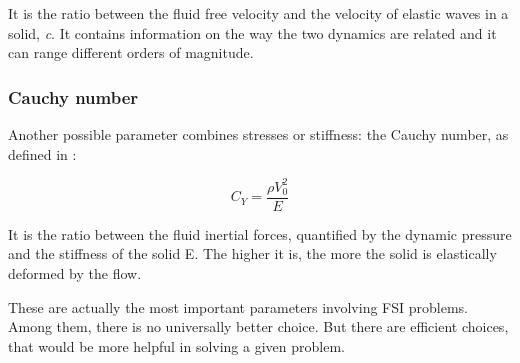 It is the ratio between the fluid free velocity and the velocity of elastic waves in a solid, \textit{c}. It contains information on the way the two dynamics are related and it can range different orders of magnitude.

\subsubsection{Cauchy number}

Another possible parameter combines stresses or stiffness: the  Cauchy number, as defined in \cite{de2001fluides}:

\begin{equation}
	C_Y = \frac{\rho V_0^2}{E}
\end{equation}

It is the ratio between the fluid inertial forces, quantified by the dynamic pressure and the stiffness of the solid E. 
The higher it is, the more the solid is elastically deformed by the flow.


These are actually the most important parameters involving FSI problems. Among them, there is no universally better choice. But there are efficient choices, that would be more helpful
in solving a given problem. 



